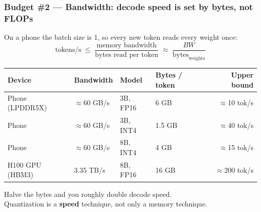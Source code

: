 \begin{frame}
\frametitle{Budget \#2 --- Bandwidth: decode speed is set by bytes, not FLOPs}
On a phone the batch size is 1, so every new token reads every weight once:
\[
\text{tokens/s} \;\le\; \frac{\text{memory bandwidth}}{\text{bytes read per token}} \;\approx\; \frac{BW}{\text{bytes}_{\text{weights}}}
\]
\centering
\begin{tabular}{@{}llllr@{}}
\toprule
Device & Bandwidth & Model & Bytes / token & Upper bound \\
\midrule
Phone (LPDDR5X) & $\approx$60 GB/s & 3B, FP16 & 6 GB   & $\approx$10 tok/s \\
Phone           & $\approx$60 GB/s & 3B, INT4 & 1.5 GB & $\approx$40 tok/s \\
Phone           & $\approx$60 GB/s & 8B, INT4 & 4 GB   & $\approx$15 tok/s \\
\midrule
H100 GPU (HBM3) & 3.35 TB/s        & 8B, FP16 & 16 GB  & $\approx$200 tok/s \\
\bottomrule
\end{tabular}

\vspace{8pt}
\begin{alertblock}{}
\centering Halve the bytes and you roughly double decode speed.\\
Quantization is a \textbf{speed} technique, not only a memory technique.
\end{alertblock}
\raggedright
{}
\end{frame}

